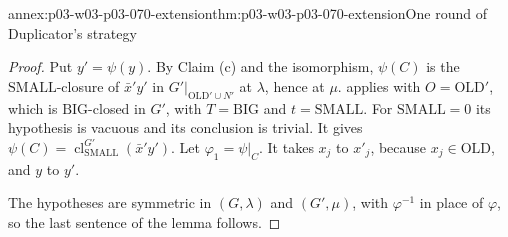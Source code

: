 \begin{annexitem}{annex:p03-w03-p03-070-extension}{thm:p03-w03-p03-070-extension}{One round of Duplicator's strategy}
\begin{proof}
Put \(y'=\psi(y)\).  By Claim (c) and the isomorphism, \(\psi(C)\) is the
\(\mathrm{SMALL}\)-closure of \(\bar x'y'\) in
\(G'|_{\mathrm{OLD}'\cup N'}\) at \(\lambda\), hence at \(\mu\).
 applies with \(O=\mathrm{OLD}'\),
which is \(\mathrm{BIG}\)-closed in \(G'\), with \(T=\mathrm{BIG}\) and
\(t=\mathrm{SMALL}\).  For \(\mathrm{SMALL}=0\) its hypothesis is vacuous and
its conclusion is trivial.  It gives
\(\psi(C)=\operatorname{cl}^{G'}_{\mathrm{SMALL}}(\bar x'y')\).  Let
\(\varphi_1=\psi|_C\).  It takes \(x_j\) to \(x'_j\), because
\(x_j\in\mathrm{OLD}\), and \(y\) to \(y'\).

The hypotheses are symmetric in \((G,\lambda)\) and \((G',\mu)\), with
\(\varphi^{-1}\) in place of \(\varphi\), so the last sentence of the lemma
follows.
\end{proof}
\end{annexitem}

